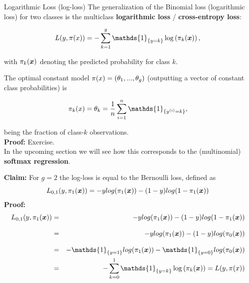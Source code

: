 \begin{vbframe}{Logarithmic Loss (log-loss)}
The generalization of the Binomial loss (logarithmic loss) for two classes is the multiclass \textbf{logarithmic loss} / \textbf{cross-entropy loss}:

\vspace*{-0.2cm}
\begin{footnotesize}
$$
  L(y, \pi(x)) = - \sum_{k = 1}^g \mathds{1}_{\{y = k\}} \log\left(\pi_k(\xv)\right),
$$
\end{footnotesize}
with $\pi_k(\bm{x})$ denoting the predicted probability for class $k$.

\vspace*{0.2cm}
 
The optimal constant model $\pi(x) = \left(\theta_1, ..., \theta_g\right)$ (outputting a vector of constant class probabilities) is
\begin{footnotesize}
$$
    \pikx = \theta_k = \frac{1}{n} \sumin \mathds{1}_{\{\yi = k\}},   
$$
\end{footnotesize}
 being the fraction of class-$k$ observations. \\
\vspace*{0.5cm}
\textbf{Proof:} Exercise. \\
\vspace*{0.5cm}
In the upcoming section we will see how this corresponds to the (multinomial) \textbf{softmax regression}. 

\framebreak
\textbf{Claim:} For $g = 2$ the log-loss is equal to the Bernoulli loss, defined as
$$L_{0, 1}(y, \pi_1(\bm{x})) = -ylog(\pi_1(\bm{x})) - (1- y) log(1- \pi_1(\bm{x}))$$
\textbf{Proof:}
\begin{eqnarray*}
L_{0, 1}(y, \pi_1(\xv)) &=& -ylog(\pi_1(\xv)) - (1- y) log(1- \pi_1(\xv))\\[0.3cm]
&=& -ylog(\pi_1(\xv)) - (1- y) log(\pi_0(\xv))\\[0.3cm]
&=& -\mathds{1}_{\{y = 1\}} log(\pi_1(\xv)) - \mathds{1}_{\{y = 0\}} log(\pi_0(\xv))\\
&=& - \sum_{k = 0}^1 \mathds{1}_{\{y = k\}} \log\left(\pi_k(\xv)\right) = L(y, \pi(x))
\end{eqnarray*}
\end{vbframe}

\endlecture
